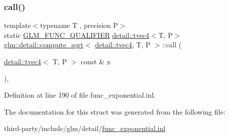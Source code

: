 \subsubsection{\texorpdfstring{call()}{call()}}
{\footnotesize\ttfamily template$<$typename T , precision P$>$ \\
static \hyperlink{setup_8hpp_a33fdea6f91c5f834105f7415e2a64407}{G\+L\+M\+\_\+\+F\+U\+N\+C\+\_\+\+Q\+U\+A\+L\+I\+F\+I\+ER} \hyperlink{structglm_1_1detail_1_1tvec4}{detail\+::tvec4}$<$T, P$>$ \hyperlink{structglm_1_1detail_1_1compute__sqrt}{glm\+::detail\+::compute\+\_\+sqrt}$<$ \hyperlink{structglm_1_1detail_1_1tvec4}{detail\+::tvec4}, T, P $>$\+::call (\begin{DoxyParamCaption}\item[{\hyperlink{structglm_1_1detail_1_1tvec4}{detail\+::tvec4}$<$ T, P $>$ const \&}]{x }\end{DoxyParamCaption})\hspace{0.3cm}{\ttfamily [inline]}, {\ttfamily [static]}}



Definition at line 190 of file func\+\_\+exponential.\+inl.



The documentation for this struct was generated from the following file\+:\begin{DoxyCompactItemize}
\item 
third-\/party/include/glm/detail/\hyperlink{func__exponential_8inl}{func\+\_\+exponential.\+inl}\end{DoxyCompactItemize}
